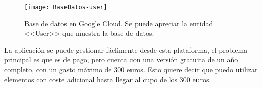 \begin{figure}[h]
\centering
\texttt{[image: BaseDatos-user]}
\caption{Base de datos en Google Cloud. Se puede apreciar la entidad <<User>> que muestra la base de datos.}
\label{fig:5.1}
\end{figure}

La aplicación se puede gestionar fáclimente desde esta plataforma, el problema principal es que es de pago, pero cuenta con una versión gratuita de un año completo, con un gasto máximo de 300 euros. Esto quiere decir que puedo utilizar elementos con coste adicional hasta llegar al cupo de los 300 euros. 
